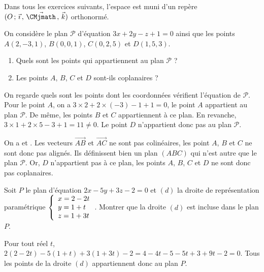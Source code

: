 \documentclass[11pt,fleqn, openany]{book} %
\begin{document}
Dans tous les exercices suivants, l'espace est muni d'un repère $\Oijk$ orthonormé.

\begin{exercise}[topic=geom14]On considère le plan $\mathcal{P}$ d'équation $3x+2y-z+1=0$ ainsi que les points $A(2,-3,1)$, $B(0,0,1)$, $C(0,2,5)$ et $D(1,5,3)$.
\begin{enumerate}
\item Quels sont les points qui appartiennent au plan $\mathcal{P}$ ?
\item Les points $A$, $B$, $C$ et $D$ sont-ils coplanaires ?
\end{enumerate}\end{exercise}

\begin{solution}On regarde quels sont les points dont les coordonnées vérifient l'équation de $\mathcal{P}$. Pour le point $A$, on a $3 \times 2 +2 \times(-3)-1+1=0$, le point $A$ appartient au plan $\mathcal{P}$. De même, les points $B$ et $C$ appartiennent à ce plan. En revanche, $3 \times 1 +2 \times 5-3+1=11 \neq 0$. Le point $D$ n'appartient donc pas au plan $\mathcal{P}$.

On a  et . Les vecteurs $\overrightarrow{AB}$ et $ \overrightarrow{AC}$ ne sont pas colinéaires, les point $A$, $B$ et $C$ ne sont donc pas alignés. Ils définissent bien un plan $(ABC)$ qui n'est autre que le plan $\mathcal{P}$. Or, $D$ n'appartient pas à ce plan, les points $A$, $B$, $C$ et $D$ ne sont donc pas coplanaires.
\end{solution}



\begin{exercise}[topic=geom14]Soit $P$ le plan d'équation $2x-5y+3z-2=0$ et $(d)$ la droite de représentation paramétrique $\left\{\renewcommand{\arraystretch}{1}\renewcommand{\arraystretch}{1}\begin{array}{l}x=2-2t \\ y=1+t \\z=1+3t\end{array}\right.$. Montrer que la droite $(d)$ est incluse dans le plan $P$.\end{exercise}

\begin{solution}Pour tout réel $t$, $2(2-2t)-5(1+t)+3(1+3t)-2=4-4t-5-5t+3+9t-2=0$. Tous les points de la droite $(d)$ appartiennent donc au plan $P$.\end{solution}
\end{document}

